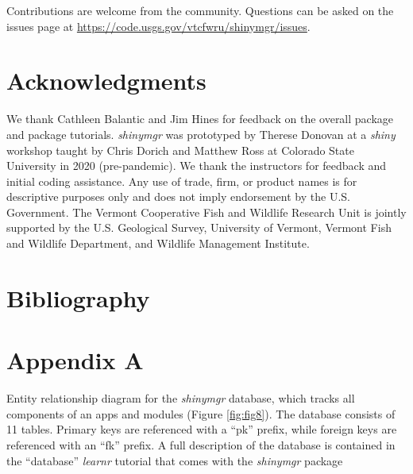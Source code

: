 Contributions are welcome from the community. Questions can be asked on the
issues page at \url{https://code.usgs.gov/vtcfwru/shinymgr/issues}.

\section{Acknowledgments}\label{acknowledgments}

We thank Cathleen Balantic and Jim Hines for feedback on the overall package and package tutorials. \emph{shinymgr} was prototyped by Therese Donovan at a \emph{shiny} workshop taught by Chris Dorich and Matthew Ross at Colorado State University in 2020 (pre-pandemic). We thank the instructors for feedback and initial coding assistance. Any use of trade, firm, or product names is for descriptive purposes only and does not imply endorsement by the U.S. Government. The Vermont Cooperative Fish and Wildlife Research Unit is jointly supported by the U.S. Geological Survey, University of Vermont, Vermont Fish and Wildlife Department, and Wildlife Management Institute.

\section{Bibliography}\label{bibliography}

\newpage

\section{Appendix A}\label{appendix-a}

Entity relationship diagram for the \emph{shinymgr} database, which tracks all components of an apps and modules (Figure \ref{fig:fig8}). The database consists of 11 tables. Primary keys are referenced with a ``pk'' prefix, while foreign keys are referenced with an ``fk'' prefix. A full description of the database is contained in the ``database'' \emph{learnr} tutorial that comes with the \emph{shinymgr} package

